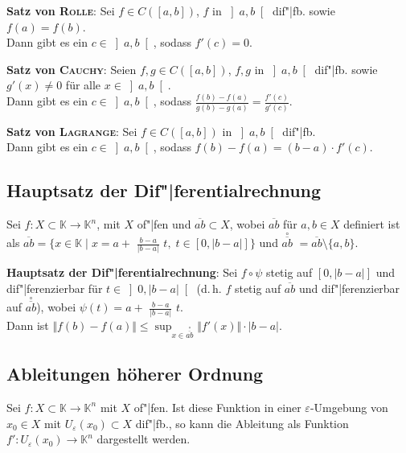 \textbf{Satz von \textsc{Rolle}}:
Sei $f \in C([a,b])$, $f$ in $\left]a,b\right[$ dif"|fb. sowie
$f(a) = f(b)$. \\
Dann gibt es ein $c \in \left]a,b\right[$, sodass $f'(c) = 0$.

\textbf{Satz von \textsc{Cauchy}}:
Seien $f,g \in C([a,b])$, $f,g$ in $\left]a,b\right[$ dif"|fb. sowie
$g'(x) \not= 0$ für alle $x \in \left]a,b\right[$. \\
Dann gibt es ein $c \in \left]a,b\right[$, sodass
{\large $\frac{f(b) - f(a)}{g(b) - g(a)} = \frac{f'(c)}{g'(c)}$}.

\textbf{Satz von \textsc{Lagrange}}:
Sei $f \in C([a,b])$ in $\left]a,b\right[$ dif"|fb. \\
Dann gibt es ein $c \in \left]a,b\right[$, sodass
$f(b) - f(a) = (b - a) \cdot f'(c)$.

\subsection{%
    Hauptsatz der Dif"|ferentialrechnung%
}

Sei $f: X \subset \mathbb{K} \rightarrow \mathbb{K}^n$, mit $X$ of"|fen und
$\overline{ab} \subset X$, wobei $\overline{ab}$ für $a, b \in X$ definiert ist
als $\overline{ab} = \{x \in \mathbb{K} \;|\;
x = a +$ {\large $\frac{b - a}{|b - a|}$} $t,\; t \in [0, |b - a|]\}$ und
{\scriptsize $\overset{\circ}{\overline{ab}}$}
$= \overline{ab} \setminus \{a, b\}$.

\textbf{Hauptsatz der Dif"|ferentialrechnung}:
Sei $f \circ \psi$ stetig auf $[0, |b - a|]$ und dif"|ferenzierbar für
$t \in \left]0, |b - a|\right[$ (d.\,h. $f$ stetig auf $\overline{ab}$ und
dif"|ferenzierbar auf {\scriptsize $\overset{\circ}{\overline{ab}}$}), wobei
$\psi(t) = a +$ {\large $\frac{b - a}{|b - a|}$} $t$. \\
Dann ist $\Vert f(b) - f(a) \Vert \le
\sup_{x \in \overset{\circ}{\overline{ab}}} \Vert f'(x) \Vert \cdot |b - a|$.

\subsection{%
    Ableitungen höherer Ordnung%
}

Sei $f: X \subset \mathbb{K} \rightarrow \mathbb{K}^n$ mit $X$ of"|fen.
Ist diese Funktion in einer $\varepsilon$-Umgebung von $x_0 \in X$
mit $U_\varepsilon(x_0) \subset X$ dif"|fb., so kann die Ableitung
als Funktion $f': U_\varepsilon(x_0) \rightarrow \mathbb{K}^n$ dargestellt
werden.

